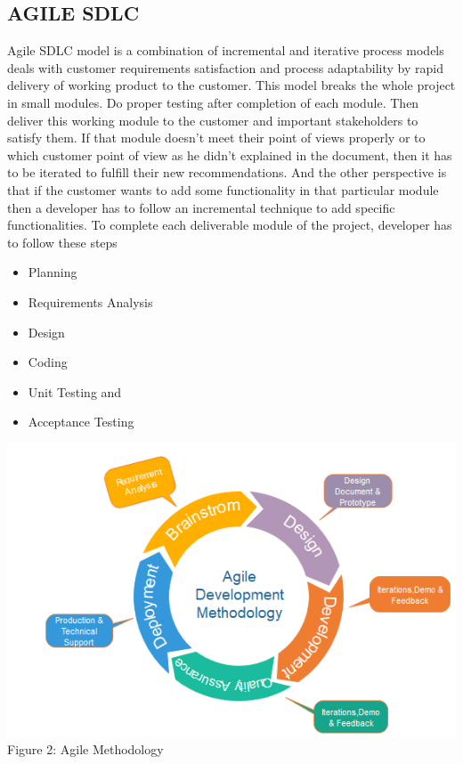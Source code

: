 \documentclass{article}
\begin{document}
\subsection{AGILE SDLC}
Agile SDLC model is a combination of incremental and iterative process models deals with customer requirements satisfaction and process adaptability by rapid delivery of working product to the customer. This model breaks the whole project in small modules. Do proper testing after completion of each module. Then deliver this working module to the customer and important stakeholders to satisfy them. If that module doesn’t meet their point of views properly or to which customer point of view as he didn’t explained in the document, then it has to be iterated to fulfill their new recommendations. And the other perspective is that if the customer wants to add some functionality in that particular module then a developer has to follow an incremental technique to add specific functionalities. 
To complete each deliverable module of the project, developer has to follow these steps
\begin{itemize}
\item Planning
\item Requirements Analysis
\item Design
\item Coding
\item Unit Testing and
\item Acceptance Testing
\end{itemize}

\begin{center}
\includegraphics[scale=0.6]{agile}
\\Figure 2: Agile Methodology
\end{center}
\end{document}
